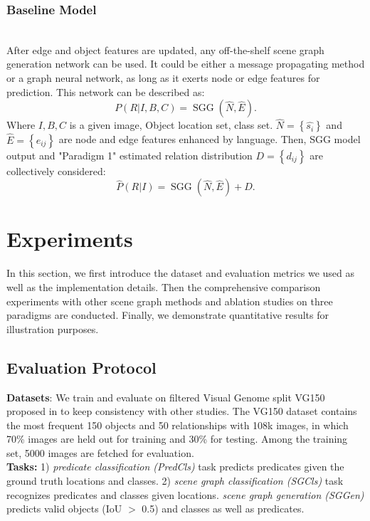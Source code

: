 \documentclass[runningheads]{llncs}
\begin{document}
\subsubsection{Baseline Model}~\\
After edge and object features are updated, any off-the-shelf scene graph
generation network can be used. It could be either a message propagating method
or a graph neural network, as long as it exerts node or edge features for
prediction. This network can be described as:
\begin{equation}
  P(R|I,B,C)=\operatorname{SGG}(\hat{N},\hat{E}).
  \label{sgg}
\end{equation}
Where $I,B,C$ is a given image, Object location set, class set.
$\hat{N}=\left\{ \hat{s_{i}}\right\}$ and $\hat{E}=\left\{
  \hat{e_{ij}}\right\}$ are node and edge features enhanced by language. Then,
SGG model output and "Paradigm 1" estimated relation distribution $D=\left\{
  {d_{ij}}\right\}$ are collectively considered:
\begin{equation}
  \hat{P}(R|I)=\operatorname{SGG}(\hat{N},\hat{E})+D.
\end{equation}
\section{Experiments}
\label{experiments}
In this section, we first introduce the dataset and evaluation metrics we used
as well as the implementation details. Then the comprehensive comparison
experiments with other scene graph methods and ablation studies on three
paradigms are conducted. Finally, we demonstrate quantitative results for
illustration purposes.
\subsection{Evaluation Protocol}
\textbf{Datasets}:  We train and evaluate on filtered Visual Genome split VG150
proposed in\cite{imp} to keep consistency with other studies. The VG150 dataset
contains the most frequent 150 objects and 50 relationships with 108k images,
in which 70\% images are held out for training and 30\% for testing. Among the
training set, 5000 images are fetched for evaluation.\\

\noindent\textbf{Tasks:} 1) \textit{predicate classification (PredCls)}  task
predicts predicates given the ground truth locations and classes. 2)
\textit{scene graph classification (SGCls)} task recognizes predicates and
classes given locations.  \textit{scene graph generation (SGGen)} predicts
valid objects (IoU $>$ 0.5) and classes as well as predicates.\\
\end{document}
